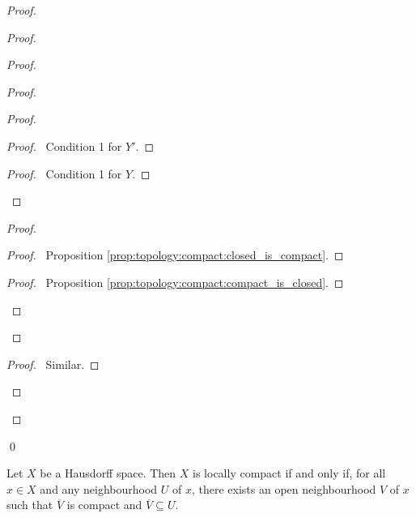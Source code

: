 \begin{proof}
\begin{proof}
\begin{proof}
\begin{proof}
\begin{proof}
\begin{proof}
            \pf\ Condition 1 for $Y'$.
          \end{proof}
          \begin{proof}
            \pf\ Condition 1 for $Y$.
          \end{proof}
        \end{proof}
        \begin{proof}
          \begin{proof}
            \pf\ Proposition \ref{prop:topology:compact:closed_is_compact}.
          \end{proof}
          \begin{proof}
            \pf\ Proposition \ref{prop:topology:compact:compact_is_closed}.
          \end{proof}
        \end{proof}
      \end{proof}
      \begin{proof}
        \pf\ Similar.
      \end{proof}
    \end{proof}
  \end{proof}
  \qed
\end{proof}

\begin{thm}
  \label{thm:topology:locally_compact:neighbourhood}
  Let $X$ be a Hausdorff space. Then $X$ is locally compact if and only if,
  for all $x \in X$ and any neighbourhood $U$ of $x$, there exists an open
  neighbourhood $V$ of $x$ such that $\overline{V}$ is compact and
  $\overline{V}
  \subseteq U$.
\end{thm}

